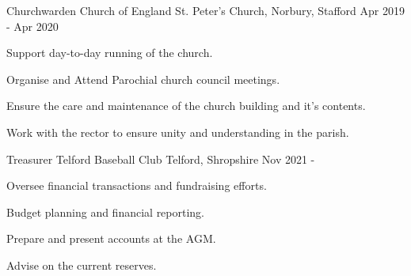 

\begin{cventries}

	\cventry
	{Churchwarden} %
	{Church of England} %
	{St. Peter's Church, Norbury, Stafford} %
	{Apr 2019 - Apr 2020} %
	{
		\begin{cvitems} %
		\item {Support day-to-day running of the church.}
		\item {Organise and Attend Parochial church council meetings.}
		\item {Ensure the care and maintenance of the church building and it's contents.}
		\item {Work with the rector to ensure unity and understanding in the parish.}
		\end{cvitems}
	}
	\cventry
	{Treasurer} %
	{Telford Baseball Club} %
	{Telford, Shropshire} %
	{Nov 2021 -} %
	{
		\begin{cvitems} %
		\item {Oversee financial transactions and fundraising efforts.}
		\item {Budget planning and financial reporting.}
		\item {Prepare and present accounts at the AGM.}
		\item {Advise on the current reserves.}
		\end{cvitems}
	}
\end{cventries}
